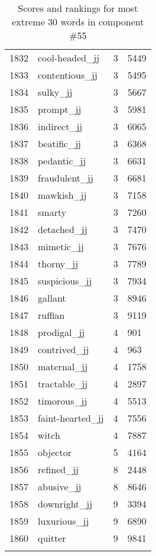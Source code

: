 \begin{longtable}[!htbp]{| rlr@{.}l |}
    1832 & cool-headed\_jj & 3 & 5449 \\
    1833 & contentious\_jj & 3 & 5495 \\
    1834 & sulky\_jj & 3 & 5667 \\
    1835 & prompt\_jj & 3 & 5981 \\
    1836 & indirect\_jj & 3 & 6065 \\
    1837 & beatific\_jj & 3 & 6368 \\
    1838 & pedantic\_jj & 3 & 6631 \\
    1839 & fraudulent\_jj & 3 & 6681 \\
    1840 & mawkish\_jj & 3 & 7158 \\
    1841 & smarty & 3 & 7260 \\
    1842 & detached\_jj & 3 & 7470 \\
    1843 & mimetic\_jj & 3 & 7676 \\
    1844 & thorny\_jj & 3 & 7789 \\
    1845 & suspicious\_jj & 3 & 7934 \\
    1846 & gallant & 3 & 8946 \\
    1847 & ruffian & 3 & 9119 \\
    1848 & prodigal\_jj & 4 & 901 \\
    1849 & contrived\_jj & 4 & 963 \\
    1850 & maternal\_jj & 4 & 1758 \\
    1851 & tractable\_jj & 4 & 2897 \\
    1852 & timorous\_jj & 4 & 5513 \\
    1853 & faint-hearted\_jj & 4 & 7556 \\
    1854 & witch & 4 & 7887 \\
    1855 & objector & 5 & 4164 \\
    1856 & refined\_jj & 8 & 2448 \\
    1857 & abusive\_jj & 8 & 8646 \\
    1858 & downright\_jj & 9 & 3394 \\
    1859 & luxurious\_jj & 9 & 6890 \\
    1860 & quitter & 9 & 9841 \\
    \hline
    \caption{Scores and rankings for most extreme 30 words in component \#55} \\
\end{longtable}
